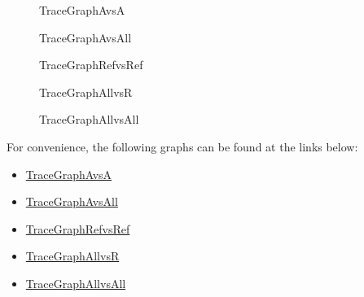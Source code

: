 \documentclass[12pt]{article}
\begin{document}
\begin{figure}[H]
\begin{center}

\caption{TraceGraphAvsA}
\label{Figure:TraceGraphAvsA}
\end{center}
\end{figure}
\begin{figure}[H]
\begin{center}

\caption{TraceGraphAvsAll}
\label{Figure:TraceGraphAvsAll}
\end{center}
\end{figure}
\begin{figure}[H]
\begin{center}

\caption{TraceGraphRefvsRef}
\label{Figure:TraceGraphRefvsRef}
\end{center}
\end{figure}
\begin{figure}[H]
\begin{center}

\caption{TraceGraphAllvsR}
\label{Figure:TraceGraphAllvsR}
\end{center}
\end{figure}
\begin{figure}[H]
\begin{center}

\caption{TraceGraphAllvsAll}
\label{Figure:TraceGraphAllvsAll}
\end{center}
\end{figure}
For convenience, the following graphs can be found at the links below:

\begin{itemize}
\item{\hyperref{../../../../traceygraphs/trajecto/avsa.svg}{}{}{TraceGraphAvsA}}
\item{\hyperref{../../../../traceygraphs/trajecto/avsall.svg}{}{}{TraceGraphAvsAll}}
\item{\hyperref{../../../../traceygraphs/trajecto/refvsref.svg}{}{}{TraceGraphRefvsRef}}
\item{\hyperref{../../../../traceygraphs/trajecto/allvsr.svg}{}{}{TraceGraphAllvsR}}
\item{\hyperref{../../../../traceygraphs/trajecto/allvsall.svg}{}{}{TraceGraphAllvsAll}}
\end{itemize}
\end{document}
